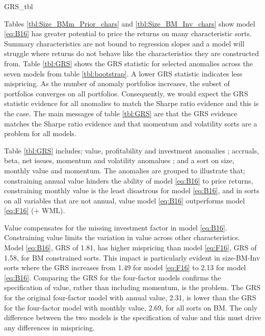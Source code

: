 
{GRS_tbl}

Tables \ref{tbl:Size_BMm_Prior_chars} and \ref{tbl:Size_BM_Inv_chars} show
model \ref{eq:B16} has greater potential to price the returns on many
characteristic sorts.
Summary characteristics are not bound to regression slopes and a model will
struggle where returns do not behave like the characteristics they are
constructed from.
Table \ref{tbl:GRS} shows the GRS statistic for selected anomalies across
the seven models from table \ref{tbl:bootstrap}.
A lower GRS statistic indicates less mispricing.
As the number of anomaly portfolios increases, the subset of portfolios converges
on all portfolios.
Consequently, we would expect the GRS statistic evidence for all
anomalies to match the Sharpe ratio evidence and this is the case.
The main messages of table \ref{tbl:GRS} are that the GRS evidence matches the
Sharpe ratio evidence and that momentum and volatility sorts are a problem for
all models.

Table \ref{tbl:GRS} includes; value, profitability and investment anomalies
\parencite{fama2006profitability, fama2015five};
accruals, beta, net issues, momentum and volatility anomalues
\parencite{fama2016dissecting}; and a sort on size, monthly value and
momentum.
The anomalies are grouped to illustrate that;
constraining annual value hinders the ability of model \ref{eq:B16} to price returns,
constraining monthly value is the least disastrous for model \ref{eq:B16}, and
in sorts on all variables that are not annual,
value model \ref{eq:B16} outperforms model \ref{eq:F16} (+ WML).

Value compensates for the missing investment factor in model \ref{eq:B16}.
Constraining value limits the variation in value across other characteristics.
Model \ref{eq:B16}, GRS of 1.81, has higher mispricing than model \ref{eq:F16},
GRS of 1.58, for BM constrained sorts.
This impact is particularly evident in size-BM-Inv sorts where the GRS increases
from 1.49 for model \ref{eq:F16} to 2.13 for model \ref{eq:B16}.
Comparing the GRS for the four-factor models confirms the specification of value,
rather than including momentum, is the problem.
The GRS for the original four-factor model with annual value, 2.31, is lower
than the GRS for the four-factor model with monthly value, 2.69, for all sorts on BM.
The only difference between the two models is the specification of value and
this must drive any differences in mispricing.

